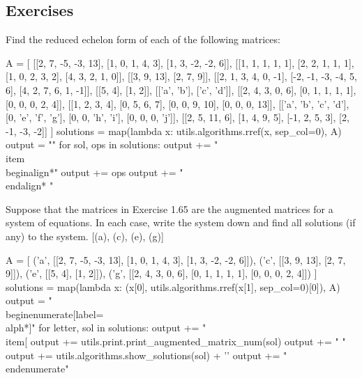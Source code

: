 \documentclass[letterpaper]{article}
\newenvironment{question}[2][Question]{\begin{trivlist}
\item[\hskip \labelsep {\bfseries #1}\hskip \labelsep {\bfseries #2.}]}{\end{trivlist}}
\begin{document}
\subsection{Exercises}

\begin{question}{1.65}
    Find the reduced echelon form of each of the following matrices:

    \begin{pycode}
A = [
    [[2, 7, -5, -3, 13], [1, 0, 1, 4, 3], [1, 3, -2, -2, 6]],
    [[1, 1, 1, 1, 1], [2, 2, 1, 1, 1], [1, 0, 2, 3, 2], [4, 3, 2, 1, 0]],
    [[3, 9, 13], [2, 7, 9]],
    [[2, 1, 3, 4, 0, -1], [-2, -1, -3, -4, 5, 6], [4, 2, 7, 6, 1, -1]],
    [[5, 4], [1, 2]],
    [['a', 'b'], ['c', 'd']],
    [[2, 4, 3, 0, 6], [0, 1, 1, 1, 1], [0, 0, 0, 2, 4]],
    [[1, 2, 3, 4], [0, 5, 6, 7], [0, 0, 9, 10], [0, 0, 0, 13]],
    [['a', 'b', 'c', 'd'], [0, 'e', 'f', 'g'], [0, 0, 'h', 'i'], [0, 0, 0, 'j']],
    [[2, 5, 11, 6], [1, 4, 9, 5], [-1, 2, 5, 3], [2, -1, -3, -2]]
]
solutions = map(lambda x: utils.algorithms.rref(x, sep_col=0), A)
output = ""
for sol, ops in solutions:
    output += "\\item \\begin{align*}\n"
    output += ops
    output += "\n\\end{align*} \n"
    \end{pycode}

    \begin{enumerate}[label=\alph*.]
    \end{enumerate}
    
\end{question}

\begin{question}{1.66}
    Suppose that the matrices in Exercise 1.65 are the augmented matrices for a 
    system of equations. In each case, write the system down and find all 
    solutions (if any) to the system. [(a), (c), (e), (g)]

    \begin{pycode}
A = [
    ('a', [[2, 7, -5, -3, 13], [1, 0, 1, 4, 3], [1, 3, -2, -2, 6]]),
    ('c', [[3, 9, 13], [2, 7, 9]]),
    ('e', [[5, 4], [1, 2]]),
    ('g', [[2, 4, 3, 0, 6], [0, 1, 1, 1, 1], [0, 0, 0, 2, 4]])
]
solutions = map(lambda x: (x[0], utils.algorithms.rref(x[1], sep_col=0)[0]), A)
output = "\\begin{enumerate}[label=\\alph*]"
for letter, sol in solutions:
    output += " \\item[%
    output += utils.print.print_augmented_matrix_num(sol)
    output += "$$ \n"
    output += utils.algorithms.show_solutions(sol) + '\n'
output += "\\end{enumerate}"
    \end{pycode}
   
\end{question}
\end{document}
